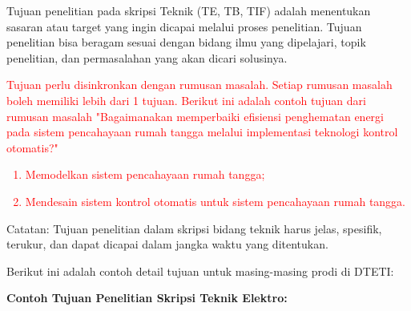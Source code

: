 Tujuan penelitian pada skripsi Teknik (TE, TB, TIF) adalah menentukan sasaran atau target yang ingin dicapai melalui proses penelitian. Tujuan penelitian bisa beragam sesuai dengan bidang ilmu yang dipelajari, topik penelitian, dan permasalahan yang akan dicari solusinya.

%
%
%


\textcolor{red}{Tujuan perlu disinkronkan dengan rumusan masalah. Setiap rumusan masalah boleh memiliki lebih dari 1 tujuan. Berikut ini adalah contoh tujuan dari rumusan masalah "Bagaimanakan memperbaiki efisiensi penghematan energi pada sistem pencahayaan rumah tangga melalui implementasi teknologi kontrol otomatis?"
\begin{enumerate}
	\item Memodelkan sistem pencahayaan rumah tangga;
	\item Mendesain sistem kontrol otomatis untuk sistem pencahayaan rumah tangga.
\end{enumerate}
}

\noindent Catatan: Tujuan penelitian dalam skripsi bidang teknik harus jelas, spesifik, terukur, dan dapat dicapai dalam jangka waktu yang ditentukan.

Berikut ini adalah contoh detail tujuan untuk masing-masing prodi di DTETI:

\newpage
\vspace{5mm}
\textbf{Contoh Tujuan Penelitian Skripsi Teknik Elektro:}

